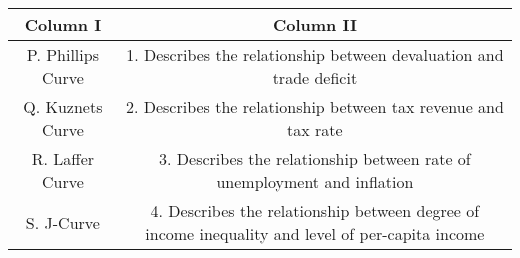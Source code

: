 \begin{tabular}{|c|c|}
\hline
\textbf{Column I} &   \textbf{Column II}  \\
\hline
P. Phillips Curve &  1.  Describes the relationship between devaluation and trade deficit \\
\hline
Q. Kuznets Curve  &  2.  Describes the relationship between tax revenue and tax rate \\
\hline
R. Laffer Curve   &  3.  Describes the relationship between rate of unemployment and inflation \\
\hline
S. J-Curve        &  4.  Describes the relationship between degree of income inequality and level of per-capita income \\
\hline
\end{tabular}
